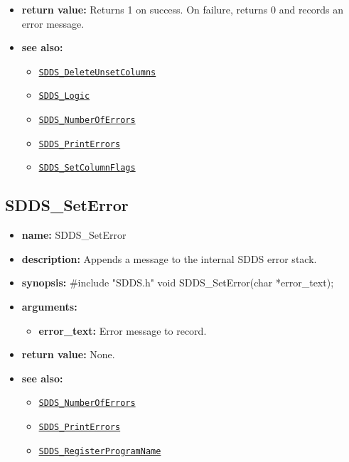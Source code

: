 \documentclass[11pt]{article}
\newcommand{\progref}[1]{\hyperref[SDDS_#1]{\tt SDDS\_#1}}
\begin{document}
\begin{itemize}
\begin{itemize}
\begin{itemize}
\item SDDS\_MATCH\_STRING - SDDS\_SetColumnsOfInterest(SDDS\_TABLE *SDDS\_table, SDDS\_MATCH\_STRING, char *string, int32\_t logic\_mode), where string is a wildcard-containing, NULL-terminated character string to which column names will be matched. The columns so matched are added to the list of columns deemed to be ``of interest'' by the caller. The order in which the caller gives the column names is recorded, and calls to SDDS\_GetRow and SDDS\_GetMatrixOfRows return the columns in this order. See the manual page for SDDS\_Logic for a discussion of the logic\_mode parameter. 
\end{itemize}
\end{itemize}
\item {\bf return value:}\newline
Returns 1 on success. On failure, returns 0 and records an error message.
\item {\bf see also:}
\begin{itemize}
\item \progref{DeleteUnsetColumns}
\item \progref{Logic}
\item \progref{NumberOfErrors}
\item \progref{PrintErrors}
\item \progref{SetColumnFlags}
\end{itemize}
\end{itemize}

\subsection{SDDS\_SetError}
\label{SDDS_SetError}

\begin{itemize}
\item {\bf name:}\newline
SDDS\_SetError
\item {\bf description:}\newline
Appends a message to the internal SDDS error stack.
\item {\bf synopsis:} \#include "SDDS.h"\newline
void SDDS\_SetError(char *error\_text);
\item {\bf arguments:}
\begin{itemize}
\item {\bf error\_text:} Error message to record.
\end{itemize}
\item {\bf return value:}\newline
None.
\item {\bf see also:}
\begin{itemize}
\item \progref{NumberOfErrors}
\item \progref{PrintErrors}
\item \progref{RegisterProgramName}
\end{itemize}
\end{itemize}
\end{document}
